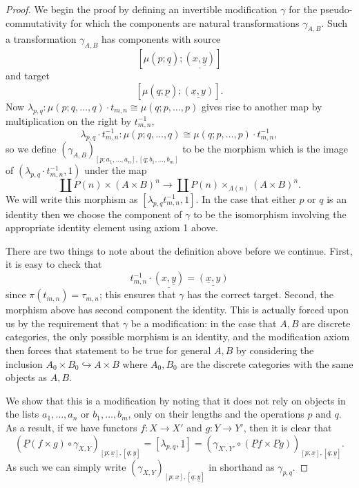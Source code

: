 \documentclass{amsbook} %
\numberwithin{section}{chapter}
\begin{document}
\begin{proof}
We begin the proof by defining an invertible modification $\gamma$ for the pseudo-commutativity for which the components are natural transformations $\gamma_{A,B}$.  Such a transformation $\gamma_{A,B}$ has components with source
\[
[\mu(p; \underline{q}); \underline{(x, \underline{y})}]
\]
and target
\[
[\mu(q; \underline{p}); \underline{(\underline{x},y)}].
\]
Now $ \lambda_{p,q} \colon \mu(p;q,\ldots,q) \cdot t_{m,n} \cong \mu(q;p,\ldots,p)$ gives rise to another map by multiplication on the right by $t_{m,n}^{-1}$,
\[
 \lambda_{p,q}\cdot t_{m,n}^{-1} \colon \mu(p;q,\ldots,q) \cong \mu(q;p,\ldots,p) \cdot t_{m,n}^{-1},
 \]
so we define $(\gamma_{A,B})_{[p;a_1,\ldots,a_n],[q;b_1,\ldots,b_m]}$ to be the morphism which is the image of $(\lambda_{p,q}\cdot t_{m,n}^{-1}, 1)$ under the map
\[
\coprod P(n) \times (A \times B)^{n} \to \coprod P(n) \times_{\Lambda(n)} (A \times B)^{n}.
\]
We will write this morphism as $[\lambda_{p,q}t_{m,n}^{-1}, 1]$.  In the case that either $p$ or $q$ is an identity then we choose the component of $\gamma$ to be the isomorphism involving the appropriate identity element using axiom 1 above.

There are two things to note about the definition above before we continue.  First, it is easy to check that
\[
t_{m,n}^{-1} \cdot \underline{(x, \underline{y})} = \underline{(\underline{x},y)}
\]
since $\pi(t_{m,n}) = \tau_{m,n}$; this ensures that $\gamma$ has the correct target.  Second, the morphism above has second component the identity.  This is actually forced upon us by the requirement that $\gamma$ be a modification:  in the case that $A,B$ are discrete categories, the only possible morphism is an identity, and the modification axiom then forces that statement to be true for general $A,B$ by considering the inclusion $A_{0} \times B_{0} \hookrightarrow A \times B$ where $A_{0}, B_{0}$ are the discrete categories with the same objects as $A, B$.

We show that this is a modification by noting that it does not rely on objects in the lists $a_1, \ldots, a_n$ or $b_1, \ldots, b_m$, only on their lengths and the operations $p$ and $q$. As a result, if we have functors $f \colon X \rightarrow X'$ and $g \colon Y \rightarrow Y'$, then it is clear that
    \[
        (\underline{P}(f\times g) \circ \gamma_{X,Y})_{[p;\underline{x}],[q;\underline{y}]} = [\lambda_{p,q},\underline{1}] = (\gamma_{X',Y'} \circ (\underline{P}f\times \underline{P}g))_{[p;\underline{x}],[q;\underline{y}]}.
    \]
As such we can simply write $(\gamma_{X,Y})_{[p;\underline{x}],[q;\underline{y}]}$ in shorthand as $\gamma_{p,q}$.


\end{proof}
\end{document}
